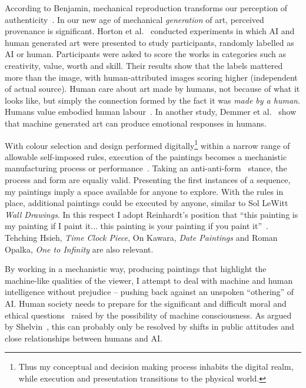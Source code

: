 \documentclass[12pt]{article}
\begin{document}
According to Benjamin, mechanical reproduction transforms our perception of authenticity~\cite{benjamin1969art}. In our new age of mechanical \emph{generation} of art, perceived provenance is significant. Horton et al.~\cite{horton2023bias} conducted experiments in which AI and  human generated art were presented to study participants, randomly labelled as AI or human. Participants were asked to score the works in categories such as creativity, value, worth and skill. Their results show that the labels mattered more than the image, with human-attributed images scoring higher (independent of actual source).  Human care about art made by humans, not because of what it looks like, but simply the connection formed by the fact it was \emph{made by a human}. Humans value embodied human labour~\cite{adorno1970aesthetic,singerman1999artist,sennett2008craftsman}. In another study, Demmer et al.~\cite{demmer2023does} show that machine generated art can produce emotional responses in humans. 

With colour selection and design performed digitally\footnote{Thus my conceptual and decision making process inhabits the digital realm, while execution and presentation transitions to the physical world.} within a narrow range of allowable self-imposed rules, execution of the paintings becomes a mechanistic manufacturing process or performance~\cite[Sentence \#28]{LeWitt1969Sentences}\cite{Jones1998BodyArt,LippardChandler1968Dematerialization,lippard1973sixyears}. Taking an anti-anti-form~\cite{Morris1968AntiForm} stance, the process and form are equaliy valid.  Presenting the first instances of a sequence, my paintings imply a space available for anyone to explore. With the rules in place, additional paintings could be executed by anyone, similar to Sol LeWitt \emph{Wall Drawings}. In this respect I adopt Reinhardt's position that ``this painting is my painting if I paint it... this painting is your painting if you paint it''~\cite{abstract-painting-1960}. Tehching Hsieh, \emph{Time Clock Piece}, On Kawara, \emph{Date Paintings} and Roman Opalka, \emph{One to Infinity} are also relevant.

By working in a mechanistic way, producing paintings that highlight the machine-like qualities of the viewer, I attempt to deal with machine and human intelligence without prejudice -- pushing back against an unspoken ``othering'' of AI. Human society needs to prepare for the significant and difficult moral and ethical questions~\cite{chalmers1996conscious,metzinger2009egotunnel,bostrom2014ethics} raised by the possibility of machine consciousness. As argued by Shelvin~\cite{shevlin2023consciousness}, this can probably only be resolved by shifts in public attitudes and close relationships between humans and AI. 
\end{document}
